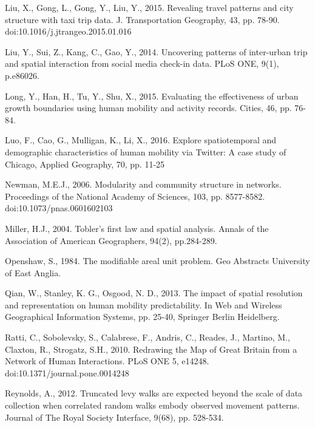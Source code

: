 \documentclass[]{tGIS2e}
\begin{document}
{\begin{thebibliography}{9}
Liu, X., Gong, L., Gong, Y., Liu, Y., 2015. Revealing travel patterns and city structure with taxi trip data. J. Transportation Geography, 43, pp. 78-90. doi:10.1016/j.jtrangeo.2015.01.016

Liu, Y., Sui, Z., Kang, C., Gao, Y., 2014. Uncovering patterns of inter-urban trip and spatial interaction from social media check-in data. PLoS ONE, 9(1), p.e86026.

Long, Y., Han, H., Tu, Y., Shu, X., 2015. Evaluating the effectiveness of urban growth boundaries using human mobility and activity records. Cities, 46, pp. 76-84.

Luo, F., Cao, G., Mulligan, K., Li, X., 2016. Explore spatiotemporal and demographic characteristics of human mobility via Twitter: A case study of Chicago, Applied Geography, 70, pp. 11-25

Newman, M.E.J., 2006. Modularity and community structure in networks. Proceedings of the National Academy of Sciences, 103, pp. 8577-8582. doi:10.1073/pnas.0601602103

Miller, H.J., 2004. Tobler's first law and spatial analysis. Annals of the Association of American Geographers, 94(2), pp.284-289.

Openshaw, S., 1984. The modifiable areal unit problem. Geo Abstracts University of East Anglia.

Qian, W., Stanley, K. G., Osgood, N. D., 2013. The impact of spatial resolution and representation on human mobility predictability. In Web and Wireless Geographical Information Systems,  pp. 25-40, Springer Berlin Heidelberg.

Ratti, C., Sobolevsky, S., Calabrese, F., Andris, C., Reades, J., Martino, M., Claxton, R., Strogatz, S.H., 2010. Redrawing the Map of Great Britain from a Network of Human Interactions. PLoS ONE 5, e14248. doi:10.1371/journal.pone.0014248

Reynolds, A., 2012. Truncated levy walks are expected beyond the scale of data collection when correlated random walks embody observed movement patterns. Journal of The Royal Society Interface, 9(68), pp. 528-534.


\end{thebibliography}}
\end{document}
